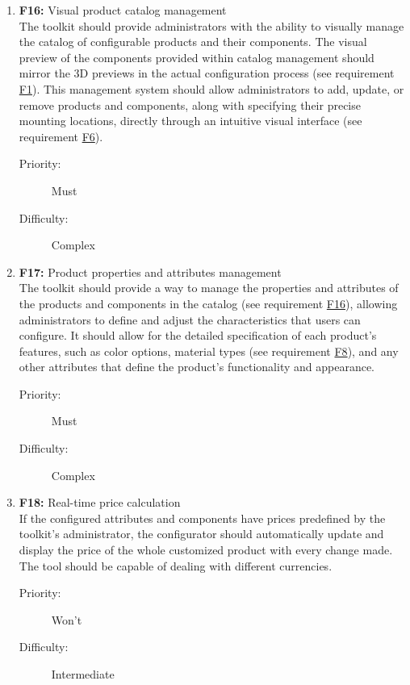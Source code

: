 \begin{enumerate}
\item \textbf{F16:} \label{itm:F16} Visual product catalog management
\vspace{2pt}
\\The toolkit should provide administrators with the ability to visually manage the catalog of configurable products and their components. The visual preview of the components provided within catalog management should mirror the 3D previews in the actual configuration process (see requirement \hyperref[itm:F1]{F1}). This management system should allow administrators to add, update, or remove products and components, along with specifying their precise mounting locations, directly through an intuitive visual interface (see requirement \hyperref[itm:F6]{F6}).
\begin{description}
    \item[Priority:] Must
    \item[Difficulty:] Complex
\end{description}
\vspace{4pt}

\item \textbf{F17:} Product properties and attributes management
\vspace{2pt}
\\The toolkit should provide a way to manage the properties and attributes of the products and components in the catalog (see requirement \hyperref[itm:F16]{F16}), allowing administrators to define and adjust the characteristics that users can configure. It should allow for the detailed specification of each product's features, such as color options, material types (see requirement \hyperref[itm:F8]{F8}), and any other attributes that define the product's functionality and appearance.
\begin{description}
    \item[Priority:] Must
    \item[Difficulty:] Complex
\end{description}
\vspace{4pt}


\item \textbf{F18:} Real-time price calculation
\vspace{2pt}
\\If the configured attributes and components have prices predefined by the toolkit's administrator, the configurator should automatically update and display the price of the whole customized product with every change made. The tool should be capable of dealing with different currencies.
\begin{description}
    \item[Priority:] Won't
    \item[Difficulty:] Intermediate
\end{description}
\vspace{4pt}


\end{enumerate}
